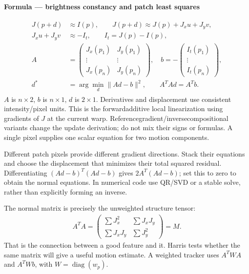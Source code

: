 \documentclass[letterpaper,11pt,english,openany,oneside]{jupyterBook}
\begin{document}
\begin{TextbookBox}
\textbf{Formula — brightness constancy and patch least squares}\par\smallskip
\begin{equation}\label{equation:lectures/lecture05/tracking:eq-lec05-lk}
\begin{split}\begin{aligned}
J(p+d)&\approx I(p),\qquad
J(p+d)\approx J(p)+J_xu+J_yv,\\
J_xu+J_yv&\approx-I_t,\qquad I_t=J(p)-I(p),\\
A&=\begin{pmatrix}J_x(p_1)&J_y(p_1)\\\vdots&\vdots\\J_x(p_n)&J_y(p_n)\end{pmatrix},\quad
b=-\begin{pmatrix}I_t(p_1)\\\vdots\\I_t(p_n)\end{pmatrix},\\
d^*&=\arg\min_d\|Ad-b\|^2,\qquad A^TAd=A^Tb.
\end{aligned}\end{split}
\end{equation}
\sphinxAtStartPar
\(A\) is \(n\times2\), \(b\) is \(n\times1\), \(d\) is \(2\times1\). Derivatives and displacement use consistent intensity/pixel units. This is the forward\sphinxhyphen{}additive local linearization using gradients of \(J\) at the current warp. Reference\sphinxhyphen{}gradient/inverse\sphinxhyphen{}compositional variants change the update derivation; do not mix their signs or formulas. A single pixel supplies one scalar equation for two motion components.

\end{TextbookBox}

\sphinxAtStartPar
{} Different patch pixels provide different gradient directions. Stack their equations and choose the displacement that minimizes their total squared residual. Differentiating \((Ad-b)^T(Ad-b)\) gives \(2A^T(Ad-b)\); set this to zero to obtain the normal equations. In numerical code use QR/SVD or a stable solve, rather than explicitly forming an inverse.

\sphinxAtStartPar
The normal matrix is precisely the unweighted structure tensor:
\begin{equation*}
\begin{split}A^TA=\begin{pmatrix}\sum J_x^2&\sum J_xJ_y\\\sum J_xJ_y&\sum J_y^2\end{pmatrix}=M.\end{split}
\end{equation*}
\sphinxAtStartPar
That is the connection between  a good feature and  it. Harris tests whether the same matrix will give a useful motion estimate. A weighted tracker uses \(A^TWA\) and \(A^TWb\), with \(W=\operatorname{diag}(w_p)\).
\end{document}
